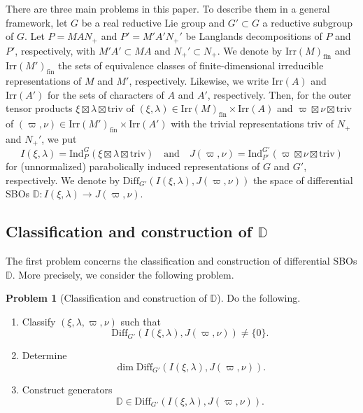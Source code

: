 \documentclass[reqno,11pt]{amsart}
\theoremstyle{remark}
\theoremstyle{definition}
\newtheorem{prob}{Problem}
\numberwithin{equation}{section}
\newcommand{\Ind}{\mathrm{Ind}}
\newcommand{\Diff}{\mathrm{Diff}}
\newcommand{\Irr}{\mathrm{Irr}}
\newcommand{\triv}{\mathrm{triv}}
\newcommand{\fin}{\mathrm{fin}}
\newcommand{\bD}{\mathbb{D}}
\begin{document}
There are three main problems in this paper. To describe them in a general framework, let $G$ be a real reductive Lie group and $G' \subset G$ a reductive subgroup of $G$.
Let $P=MAN_+$ and $P'=M'A'N_+'$ be Langlands decompositions 
of $P$ and $P'$, respectively, with $M'A' \subset MA$ and $N_+' \subset N_+$.
We denote by $\Irr(M)_{\fin}$ and $\Irr(M')_{\fin}$ the sets of equivalence classes of 
finite-dimensional irreducible representations of $M$ and $M'$, respectively.
Likewise, we write $\Irr(A)$ and $\Irr(A')$ for the sets of characters of $A$ and 
$A'$, respectively. Then, for the outer tensor products 
$\xi \boxtimes \lambda \boxtimes \triv$ 
of $(\xi, \lambda) \in \Irr(M)_\fin \times \Irr(A)$ and
$\varpi \boxtimes \nu \boxtimes \triv$
of
$(\varpi, \nu) \in \Irr(M')_\fin \times \Irr(A')$ with
the trivial representations $\triv$ of $N_+$ and $N_+'$,
we put
\begin{equation*}
I(\xi,\lambda) = \Ind_{P}^G(\xi \boxtimes \lambda \boxtimes \triv)
\quad
\text{and}
\quad
J(\varpi,\nu) = \Ind_{P'}^{G'}(\varpi \boxtimes \nu \boxtimes \triv)
\end{equation*}
for (unnormalized) parabolically induced representations of $G$ and $G'$,
respectively.
We denote by
$\Diff_{G'}(I(\xi,\lambda), J(\varpi,\nu))$ the space of differential SBOs
$\bD\colon I(\xi,\lambda) \to J(\varpi,\nu)$. 

\subsection{Classification and construction of $\bD$}

The first problem concerns the classification and construction of differential SBOs $\bD$.
More precisely, we consider the following problem.

\begin{prob}[{Classification and construction of $\bD$}]
\label{prob:A}
Do the following.
\begin{enumerate}
\item[(A1)] 
Classify $(\xi,\lambda, \varpi, \nu)$ such that
\begin{equation*}
\Diff_{G'}(I(\xi,\lambda), J(\varpi,\nu)) \neq \{0\}.
\end{equation*}

\item[(A2)] 
Determine 
\begin{equation*}
\dim \Diff_{G'}(I(\xi,\lambda), J(\varpi,\nu)).
\end{equation*}

\item[(A3)] 
Construct generators
\begin{equation*}
\bD \in \Diff_{G'}(I(\xi,\lambda), J(\varpi,\nu)).
\end{equation*}

\end{enumerate}

\end{prob}
\end{document}

